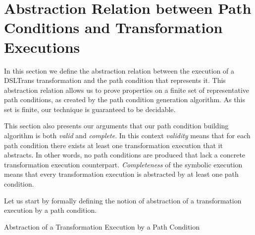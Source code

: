 \section{Abstraction Relation between Path Conditions and Transformation Executions}
\label{sec:abstraction_relation}






In this section we define the abstraction relation between the execution of a
DSLTrans transformation and the path condition that represents it.
This abstraction relation allows us to prove properties on a finite set of representative
path conditions, as created by the path condition generation algorithm. As this set is finite, our technique is  guaranteed to be decidable.

This section also presents our arguments that our path condition building
algorithm is both \emph{valid} and \emph{complete}. In this context
\emph{validity} means that for each path condition there exists at least one
transformation execution that it abstracts.
In other words, no path conditions are produced that lack a concrete
transformation execution counterpart. \emph{Completeness} of the symbolic
execution means that every transformation execution is abstracted by at least
one path condition.

Let us start by formally defining the notion of abstraction of a transformation
execution by a path condition.

\setcounter{equation}{0} 

\begin{definition}{Abstraction of a Transformation Execution by a Path Condition\\}
\label{def:abstraction_pc_ex}
\end{definition} 


